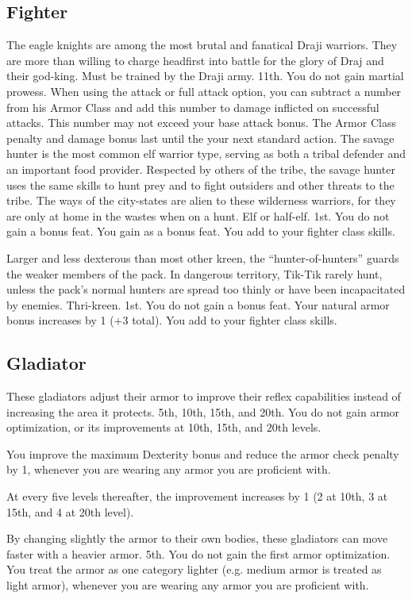 \subsection{Fighter}
{The eagle knights are among the most brutal and fanatical Draji warriors. They are more than willing to charge headfirst into battle for the glory of Draj and their god-king.}
{Must be trained by the Draji army.}
{11th.}
{You do not gain martial prowess.}
{
	When using the attack or full attack option, you can subtract a number from his Armor Class and add this number to damage inflicted on successful attacks. This number may not exceed your base attack bonus. The Armor Class penalty and damage bonus last until the your next standard action.
}
{The savage hunter is the most common elf warrior type, serving as both a tribal defender and an important food provider. Respected by others of the tribe, the savage hunter uses the same skills to hunt prey and to fight outsiders and other threats to the tribe. The ways of the city-states are alien to these wilderness warriors, for they are only at home in the wastes when on a hunt.}
{Elf or half-elf.}
{1st.}
{You do not gain a bonus feat.}
{
	You gain  as a bonus feat. You add  to your fighter class skills.
}

{Larger and less dexterous than most other kreen, the ``hunter-of-hunters'' guards the weaker members of the pack. In dangerous territory, Tik-Tik rarely hunt, unless the pack's normal hunters are spread too thinly or have been incapacitated by enemies.}
{Thri-kreen.}
{1st.}
{You do not gain a bonus feat.}
{
	Your natural armor bonus increases by 1 (+3 total). You add  to your fighter class skills.
}

\subsection{Gladiator}
{These gladiators adjust their armor to improve their reflex capabilities instead of increasing the area it protects.}
{}
{5th, 10th, 15th, and 20th.}
{You do not gain armor optimization, or its improvements at 10th, 15th, and 20th levels.}
{
	You improve the maximum Dexterity bonus and reduce the armor check penalty by 1, whenever you are wearing any armor you are proficient with.

	At every five levels thereafter, the improvement increases by 1 (2 at 10th, 3 at 15th, and 4 at 20th level).
}
{By changing slightly the armor to their own bodies, these gladiators can move faster with a heavier armor.}
{}
{5th.}
{You do not gain the first armor optimization.}
{
	You treat the armor as one category lighter (e.g. medium armor is treated as light armor), whenever you are wearing any armor you are proficient with.
}

